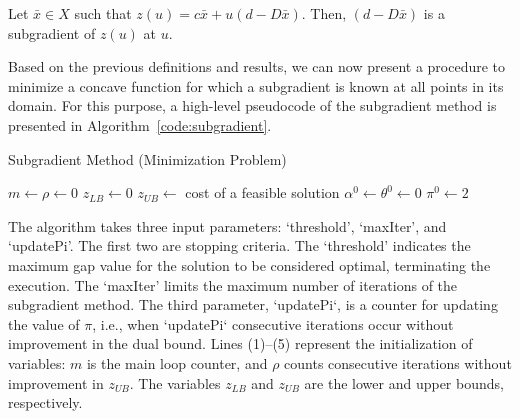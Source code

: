 \begin{proposition}
	Let $\bar{x} \in X$ such that $z(u) = c \bar{x} + u(d - D\bar{x})$. Then, $(d - D\bar{x})$ is a subgradient of $z(u)$ at $u$.
\end{proposition}

Based on the previous definitions and results, we can now present a procedure to
minimize a concave function for which a subgradient is known at all points in
its domain. For this purpose, a high-level pseudocode of the subgradient method
is presented in Algorithm~\ref{code:subgradient}.

\begin{algorithm}[!ht]
	\caption{\label{code:subgradient} Subgradient Method (Minimization Problem)}
	\SetAlgoLined
	$m \leftarrow \rho \leftarrow 0$\;
	$z_{LB} \leftarrow 0$\;
	$z_{UB} \leftarrow$ cost of a feasible solution\;
	$\alpha^{0} \leftarrow \theta^{0} \leftarrow 0$\; $\pi^{0} \leftarrow 2$\;

\end{algorithm}

The algorithm takes three input parameters: `threshold', `maxIter', and
`updatePi'. The first two are stopping criteria. The `threshold' indicates the
maximum gap value for the solution to be considered optimal, terminating the
execution. The `maxIter' limits the maximum number of iterations of the
subgradient method. The third parameter, `updatePi`, is a counter for updating
the value of $\pi$, i.e., when `updatePi` consecutive iterations occur without
improvement in the dual bound. Lines (1)–(5) represent the initialization of
variables: $m$ is the main loop counter, and $\rho$ counts consecutive
iterations without improvement in $z_{UB}$. The variables $z_{LB}$ and $z_{UB}$
are the lower and upper bounds, respectively.


